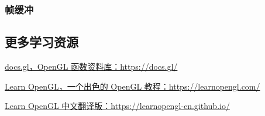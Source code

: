 \documentclass[fontset=windows]{ctexart}
\begin{document}
\subsubsection{帧缓冲}

\subsection{更多学习资源}

\label{sec-gl:study-resources}

\href{https://docs.gl}{docs.gl，OpenGL 函数资料库：https://docs.gl/}

\href{https://learnopengl.com/}{Learn OpenGL，一个出色的 OpenGL 教程：https://learnopengl.com/}

\href{https://learnopengl-cn.github.io/}{Learn OpenGL 中文翻译版：https://learnopengl-cn.github.io/}
\end{document}
